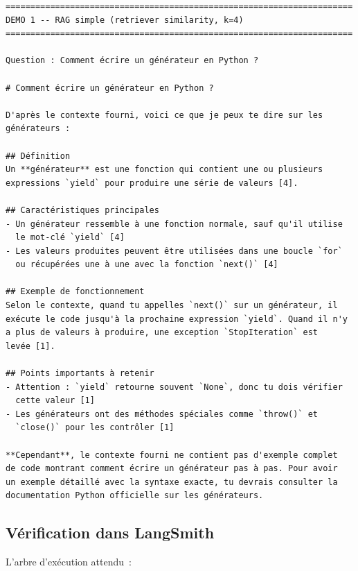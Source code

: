 \documentclass[11pt,a4paper]{article}
\begin{document}
\begin{tcolorbox}[
  colback=white,
  colframe=black!50,
  coltitle=black,
  fonttitle=\footnotesize\bfseries,
  fontupper=\footnotesize,
  title=Sortie de l'exécution,
  breakable,
]
\begin{verbatim}
======================================================================
DEMO 1 -- RAG simple (retriever similarity, k=4)
======================================================================

Question : Comment écrire un générateur en Python ?

# Comment écrire un générateur en Python ?

D'après le contexte fourni, voici ce que je peux te dire sur les
générateurs :

## Définition
Un **générateur** est une fonction qui contient une ou plusieurs
expressions `yield` pour produire une série de valeurs [4].

## Caractéristiques principales
- Un générateur ressemble à une fonction normale, sauf qu'il utilise
  le mot-clé `yield` [4]
- Les valeurs produites peuvent être utilisées dans une boucle `for`
  ou récupérées une à une avec la fonction `next()` [4]

## Exemple de fonctionnement
Selon le contexte, quand tu appelles `next()` sur un générateur, il
exécute le code jusqu'à la prochaine expression `yield`. Quand il n'y
a plus de valeurs à produire, une exception `StopIteration` est
levée [1].

## Points importants à retenir
- Attention : `yield` retourne souvent `None`, donc tu dois vérifier
  cette valeur [1]
- Les générateurs ont des méthodes spéciales comme `throw()` et
  `close()` pour les contrôler [1]

**Cependant**, le contexte fourni ne contient pas d'exemple complet
de code montrant comment écrire un générateur pas à pas. Pour avoir
un exemple détaillé avec la syntaxe exacte, tu devrais consulter la
documentation Python officielle sur les générateurs.
\end{verbatim}
\end{tcolorbox}

\subsection{Vérification dans LangSmith}

L'arbre d'exécution attendu~:
\end{document}
